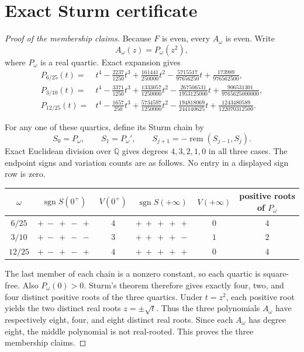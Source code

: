 \documentclass[11pt]{article}
\begin{document}
\section{Exact Sturm certificate}

\begin{proof}[Proof of the membership claims]
Because $F$ is even, every $A_\omega$ is even. Write
\[
  A_\omega(z)=P_\omega(z^2),
\]
where $P_\omega$ is a real quartic. Exact expansion gives
\begin{align*}
P_{6/25}(t)
={}&t^4-\frac{2237}{1250}t^3+\frac{161441}{250000}t^2
-\frac{5715517}{97656250}t+\frac{173989}{976562500},\\
P_{3/10}(t)
={}&t^4-\frac{3371}{1250}t^3+\frac{1333057}{1250000}t^2
-\frac{267506531}{1953125000}t
+\frac{906531301}{9765625000000},\\
P_{12/25}(t)
={}&t^4-\frac{1657}{250}t^3+\frac{5734597}{1250000}t^2
-\frac{194818069}{244140625}t
+\frac{1243480589}{122070312500}.
\end{align*}

For any one of these quartics, define its Sturm chain by
\[
  S_0=P_\omega,
  \qquad S_1=P_\omega',
  \qquad S_{j+1}=-\operatorname{rem}(S_{j-1},S_j).
\]
Exact Euclidean division over $\mathbb{Q}$ gives degrees
$4,3,2,1,0$ in all three cases. The endpoint signs and variation counts are
as follows. No entry in a displayed sign row is zero.

\begin{center}
\small
\begin{tabular}{@{}c c c c c c@{}}
\toprule
$\omega$ & $\operatorname{sgn}S(0^+)$ & $V(0^+)$
& $\operatorname{sgn}S(+\infty)$ & $V(+\infty)$
& positive roots of $P_\omega$ \\
\midrule
$6/25$  & $+\ -\ +\ -\ +$ & $4$ & $+\ +\ +\ +\ +$ & $0$ & $4$ \\
$3/10$  & $+\ -\ +\ -\ -$ & $3$ & $+\ +\ +\ +\ -$ & $1$ & $2$ \\
$12/25$ & $+\ -\ +\ -\ +$ & $4$ & $+\ +\ +\ +\ +$ & $0$ & $4$ \\
\bottomrule
\end{tabular}
\end{center}

The last member of each chain is a nonzero constant, so each quartic is
square-free. Also $P_\omega(0)>0$. Sturm's theorem therefore gives exactly
four, two, and four distinct positive roots of the three quartics. Under
$t=z^2$, each positive root yields the two distinct real roots
$z=\mathbin{\pm}\sqrt{t}$. Thus the three polynomials $A_\omega$ have
respectively eight, four, and eight distinct real roots. Since each
$A_\omega$ has degree eight, the middle polynomial is not real-rooted. This
proves the three membership claims.
\end{proof}
\end{document}
